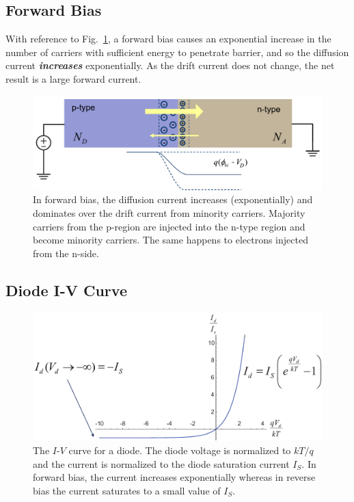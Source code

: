  
\subsection{Forward Bias}

With reference to Fig.~\ref{fig:slide36b}, a forward bias causes an exponential increase in the number of carriers with sufficient energy to penetrate barrier, and so the diffusion current \textbf{\textit{increases}} exponentially.  As the drift current does not change, the net result is a large forward current.
 

\begin{figure}[tb]
\begin{center}
\includegraphics[width=.75\columnwidth]{slide36b}
\end{center}
\caption{In forward bias, the diffusion current increases (exponentially) and dominates over the drift current from minority carriers.  Majority carriers from the p-region are injected into the n-type region and become minority carriers. The same happens to electrons injected from the n-side.} \label{fig:slide36b}
\end{figure}

 
 


\subsection{Diode I-V Curve}

\begin{figure}[tb]
\begin{center}
\includegraphics[width=.75\columnwidth]{slide38}
\end{center}
\caption{The $I$-$V$ curve for a diode.  The diode voltage is normalized to $kT/q$ and the current is normalized to the diode saturation current $I_S$.   In forward bias, the current increases exponentially whereas in reverse bias the current saturates to a small value of $I_S$.  } \label{fig:slide38}
\end{figure}

